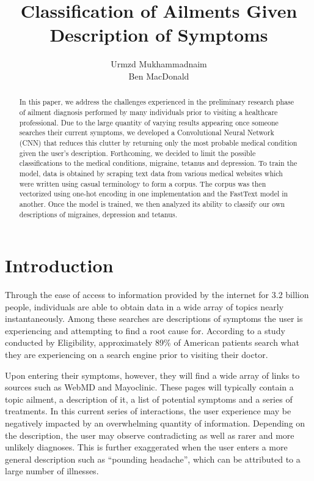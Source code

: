\documentclass[12pt]{report}
\title{Classification of Ailments Given Description of Symptoms}
\author{Urmzd Mukhammadnaim \\ Ben MacDonald}
\begin{document}
\maketitle
\tableofcontents
\begin{abstract}
	In this paper, we address the challenges experienced in the preliminary research phase
	of ailment diagnosis performed by many individuals prior to visiting a
	healthcare professional. Due to the large quantity of varying results appearing
	once someone searches their current symptoms, we developed a Convolutional
	Neural Network (CNN) that reduces this clutter by returning only the most
	probable medical condition given the user's description. Forthcoming, we
	decided to limit the possible classifications to the medical conditions,
	migraine, tetanus and depression. To train the model, data is obtained by
	scraping text data from various medical websites which were written using
	casual terminology to form a corpus. The corpus was then vectorized using
	one-hot encoding in one implementation and the FastText model in another. Once
	the model is trained, we then analyzed its ability to classify our own
	descriptions of migraines, depression and tetanus.
\end{abstract}
\chapter{Introduction}
Through the ease of access to information provided by the internet for 3.2
billion people, individuals are able to obtain data in a wide array of topics
nearly instantaneously. Among these searches are descriptions of symptoms the
user is experiencing and attempting to find a root cause for. According to a
study conducted by Eligibility, approximately 89\% of American patients search
what they are experiencing on a search engine prior to visiting their doctor.

Upon entering their symptoms, however, they will find a wide array of links to
sources such as WebMD and Mayoclinic. These pages will typically contain a
topic ailment, a description of it, a list of potential symptoms and a series
of treatments. In this current series of interactions, the user experience may
be negatively impacted by an overwhelming quantity of information. Depending on
the description, the user may observe contradicting as well as rarer and more
unlikely diagnoses. This is further exaggerated when the user enters a more
general description such as “pounding headache”, which can be attributed to a
large number of illnesses.
\end{document}
